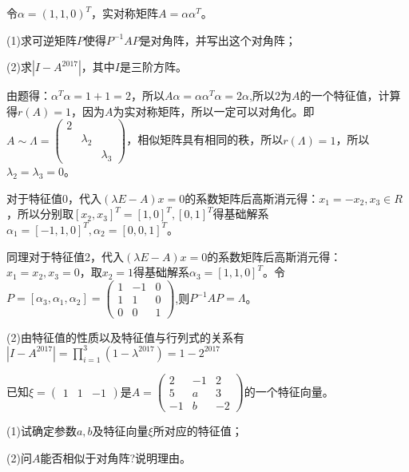 \documentclass[a4paper]{report}
\begin{document}
\EX 令$\alpha=(1,1,0)^T$，实对称矩阵$A=\alpha\alpha^T$。

(1)求可逆矩阵$P$使得$P^{-1}AP$是对角阵，并写出这个对角阵；

(2)求$|I-A^{2017}|$，其中$I$是三阶方阵。

\begin{jie}
由题得：$\alpha^T\alpha=1+1=2$，所以$A\alpha=\alpha\alpha^T\alpha=2\alpha$,所以$2$为$A$的一个特征值，计算得$r(A)=1$，因为$A$为实对称矩阵，所以一定可以对角化。即$A\sim \Lambda=
\begin{pmatrix}
2\\&\lambda_2\\&&\lambda_3
\end{pmatrix}
$，相似矩阵具有相同的秩，所以$r(\Lambda)=1$，所以$\lambda_2=\lambda_3=0$。

对于特征值0，代入$(\lambda E-A)x=0$的系数矩阵后高斯消元得：$x_1=-x_2,x_3\in R$，所以分别取$[x_2,x_3]^T=[1,0]^T,[0,1]^T$得基础解系$\alpha_1=[-1,1,0]^T,\alpha_2=[0,0,1]^T$。

同理对于特征值2，代入$(\lambda E-A)x=0$的系数矩阵后高斯消元得：$x_1=x_2,x_3=0$，取$x_2=1$得基础解系$\alpha_3=[1,1,0]^T$。令$
P=[\alpha_3,\alpha_1,\alpha_2]=
\begin{pmatrix}
1&-1&0\\
1&1&0\\
0&0&1
\end{pmatrix}
$,则$P^{-1}AP=\Lambda$。

(2)由特征值的性质以及特征值与行列式的关系有$
|I-A^{2017}|=\prod\limits_{i=1}^3(1-\lambda^{2017})=1-2^{2017}
$
\end{jie}

\EX 已知$
\xi=
\begin{pmatrix}
1&1&-1
\end{pmatrix}
$是$A=
\begin{pmatrix}
2&-1&2\\
5&a&3\\
-1&b&-2
\end{pmatrix}
$的一个特征向量。

(1)试确定参数$a,b$及特征向量$\xi$所对应的特征值；

(2)问$A$能否相似于对角阵?说明理由。
\end{document}
